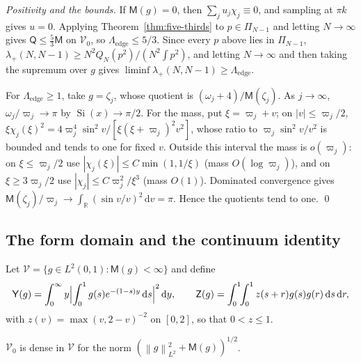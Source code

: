 \documentclass{siamart251216}
\newcommand{\Pn}{\Pi}
\newcommand{\R}{\mathbb R}
\newcommand{\norm}[1]{\left\lVert#1\right\rVert}
\newcommand{\dd}{\,\mathrm d}
\begin{document}
\emph{Positivity and the bounds.} If $\mathsf M(g)=0$, then
$\sum_ju_j\chi_j\equiv0$, and sampling at $\pi k$ gives $u=0$. Applying
Theorem~\ref{thm:five-thirds} to $p\in\Pn_{N-1}$ and letting
$N\to\infty$ gives $\mathsf Q\le\frac53\mathsf M$ on $\mathcal V_0$, so
$\Lambda_{\mathrm{edge}}\le5/3$. Since every $p$ above lies in
$\Pn_{N-1}$, $\lambda_+(N,N-1)\ge N^2Q_N(p^2)/(N^2\int p^2)$, and letting
$N\to\infty$ and then taking the supremum over $g$ gives
$\liminf\lambda_+(N,N-1)\ge\Lambda_{\mathrm{edge}}$.

For $\Lambda_{\mathrm{edge}}\ge1$, take $g=\zeta_j$, whose quotient is
$(\omega_j+4)/\mathsf M(\zeta_j)$. As $j\to\infty$,
$\omega_j/\varpi_j\to\pi$ by $\operatorname{Si}(x)\to\pi/2$. For the mass, put
$\xi=\varpi_j+v$; on $|v|\le \varpi_j/2$,
$\xi\chi_j(\xi)^2=4\varpi_j^4\sin^2v/[\xi(\xi+\varpi_j)^2v^2]$, whose ratio to
$\varpi_j\sin^2v/v^2$ is bounded and tends to one for fixed $v$. Outside this
interval the mass is $o(\varpi_j)$: on $\xi\le \varpi_j/2$ use
$|\chi_j(\xi)|\le C\min(1,1/\xi)$ (mass $O(\log \varpi_j)$), and on
$\xi\ge3\varpi_j/2$ use $|\chi_j|\le C\varpi_j^2/\xi^3$ (mass $O(1)$). Dominated
convergence gives $\mathsf M(\zeta_j)/\varpi_j\to\int_{\R}(\sin v/v)^2\dd v=\pi$.
Hence the quotients tend to one. \qed

\subsection{The form domain and the continuum identity}\label{app:edge-continuum}

Let $\mathcal V=\{g\in L^2(0,1):\mathsf M(g)<\infty\}$ and define
\[
 \mathsf Y(g)=\int_0^\infty y\Bigl|\int_0^1g(s)e^{-(1-s)y}\dd s\Bigr|^2\dd y,\qquad
 \mathsf Z(g)=\int_0^1\!\!\int_0^1z(s+r)g(s)g(r)\dd s\dd r,
\]
with $z(v)=\max(v,2-v)^{-2}$ on $[0,2]$, so that $0<z\le1$.

\begin{lemma}\label{lem:core-dense}
$\mathcal V_0$ is dense in $\mathcal V$ for the norm
$(\norm g_{L^2}^2+\mathsf M(g))^{1/2}$.
\end{lemma}
\end{document}
